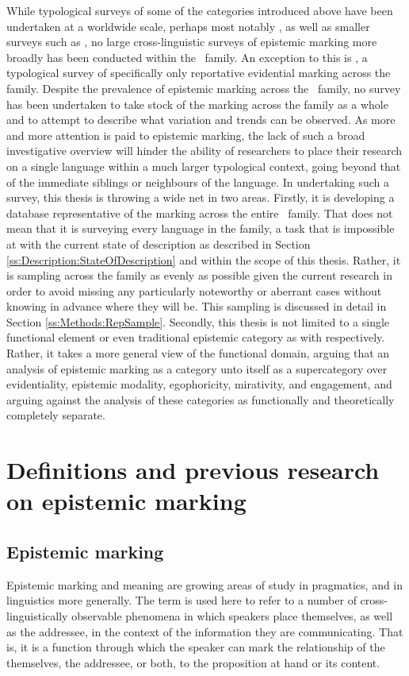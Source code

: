 While typological surveys of some of the categories introduced above have been undertaken at a worldwide scale, perhaps most notably , as well as smaller surveys such as , no large cross-linguistic surveys of epistemic marking more broadly has been conducted within the \lfam\ family. An exception to this is , a typological survey of specifically only reportative evidential marking across the family. Despite the prevalence of epistemic marking across the \lfam\ family, no survey has been undertaken to take stock of the marking across the family as a whole and to attempt to describe what variation and trends can be observed. As more and more attention is paid to epistemic marking, the lack of such a broad investigative overview will hinder the ability of researchers to place their research on a single language within a much larger typological context, going beyond that of the immediate siblings or neighbours of the language. In undertaking such a survey, this thesis is throwing a wide net in two areas. Firstly, it is developing a database representative of the marking across the entire \lfam\ family. That does not mean that it is surveying every language in the family, a task that is impossible at with the current state of description as described in Section \ref{ss:Description:StateOfDescription} and within the scope of this thesis. Rather, it is sampling across the family as evenly as possible given the current research in order to avoid missing any particularly noteworthy or aberrant cases without knowing in advance where they will be. This sampling is discussed in detail in Section \ref{ss:Methods:RepSample}. Secondly, this thesis is not limited to a single functional element or even traditional epistemic category as with  respectively. Rather, it takes a more general view of the functional domain, arguing that an analysis of epistemic marking as a category unto itself as a supercategory over evidentiality, epistemic modality, egophoricity, mirativity, and engagement, and arguing against the analysis of these categories as functionally and theoretically completely separate.

\section{Definitions and previous research on epistemic marking}\label{s:Intro:EpistemicIntro}
\subsection{Epistemic marking}
Epistemic marking and meaning are growing areas of study in pragmatics, and in linguistics more generally. The term is used here to refer to a number of cross-linguistically observable phenomena in which speakers place themselves, as well as the addressee, in the context of the information they are communicating. That is, it is a function through which the speaker can mark the relationship of the themselves, the addressee, or both, to the proposition at hand or its content. 

